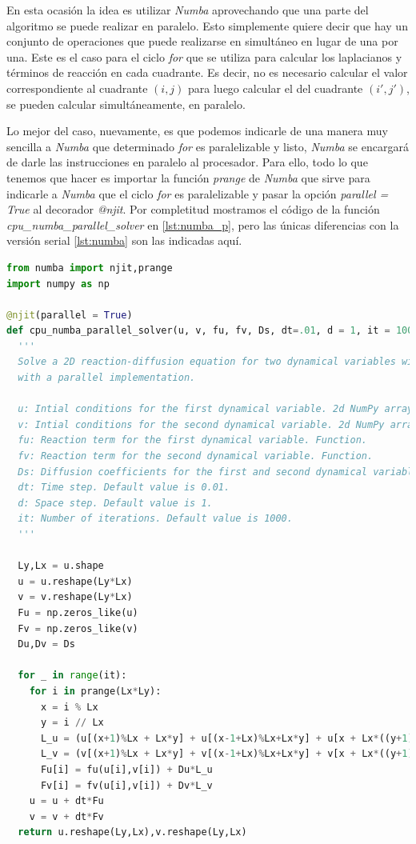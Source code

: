 En esta ocasión la idea es utilizar \textit{Numba} aprovechando que una parte del algoritmo se puede realizar en paralelo. Esto simplemente quiere decir que 
hay un conjunto de operaciones que puede realizarse en simultáneo en lugar de una por una. Este es el caso para el ciclo \textit{for} que se utiliza 
para calcular los laplacianos y términos de reacción en cada cuadrante. Es decir, no es necesario calcular el valor correspondiente al cuadrante $(i,j)$ para 
luego calcular el del cuadrante $(i',j')$, se pueden calcular simultáneamente, en paralelo.

Lo mejor del caso, nuevamente, es que podemos indicarle de una manera muy sencilla a \textit{Numba} que determinado \textit{for} es paralelizable y listo,
\textit{Numba} se encargará de darle las instrucciones en paralelo al procesador. Para ello, todo lo que tenemos que hacer es importar la función \textit{prange}
de \textit{Numba} que sirve para indicarle a \textit{Numba} que el ciclo \textit{for} es paralelizable y pasar la opción \textit{parallel = True} al decorador 
\textit{@njit}. Por completitud mostramos el código de la función \textit{cpu\_numba\_parallel\_solver} en \ref{lst:numba_p}, pero las únicas diferencias con 
la versión serial \ref{lst:numba} son las indicadas aquí.

\begin{lstlisting}[language=Python,caption = Implementación paralela con \textit{Numba}.,label = {lst:numba_p}]
from numba import njit,prange
import numpy as np

@njit(parallel = True)
def cpu_numba_parallel_solver(u, v, fu, fv, Ds, dt=.01, d = 1, it = 1000):
  '''
  Solve a 2D reaction-diffusion equation for two dynamical variables with periodic boundary conditions using Numba 
  with a parallel implementation.

  u: Intial conditions for the first dynamical variable. 2d NumPy array of shape (Ly,Lx).
  v: Intial conditions for the second dynamical variable. 2d NumPy array of shape (Ly,Lx).
  fu: Reaction term for the first dynamical variable. Function.
  fv: Reaction term for the second dynamical variable. Function.
  Ds: Diffusion coefficients for the first and second dynamical variables. List or array of length 2.
  dt: Time step. Default value is 0.01.
  d: Space step. Default value is 1.
  it: Number of iterations. Default value is 1000.
  '''   

  Ly,Lx = u.shape
  u = u.reshape(Ly*Lx)
  v = v.reshape(Ly*Lx)
  Fu = np.zeros_like(u)
  Fv = np.zeros_like(v)
  Du,Dv = Ds
  
  for _ in range(it):
    for i in prange(Lx*Ly):
      x = i % Lx
      y = i // Lx
      L_u = (u[(x+1)%Lx + Lx*y] + u[(x-1+Lx)%Lx+Lx*y] + u[x + Lx*((y+1)%Ly)] + u[x + Lx*((y-1+Ly)%Ly)] - 4*u[i])/d**2
      L_v = (v[(x+1)%Lx + Lx*y] + v[(x-1+Lx)%Lx+Lx*y] + v[x + Lx*((y+1)%Ly)] + v[x + Lx*((y-1+Ly)%Ly)] - 4*v[i])/d**2
      Fu[i] = fu(u[i],v[i]) + Du*L_u 
      Fv[i] = fv(u[i],v[i]) + Dv*L_v
    u = u + dt*Fu
    v = v + dt*Fv
  return u.reshape(Ly,Lx),v.reshape(Ly,Lx)
\end{lstlisting}

